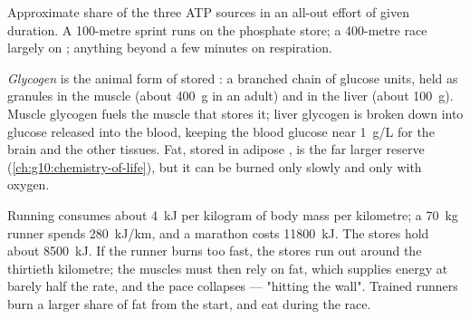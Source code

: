\begin{omfigure}

{\small Approximate share of the three ATP sources in an all-out effort
of given duration. A 100-metre sprint runs on the phosphate store; a
400-metre race largely on ; anything beyond a few minutes
on respiration.}
\end{omfigure}

\begin{definition}[Glycogen]\label{def:g10:exercise-and-energy:glycogen}
\emph{Glycogen} is the animal form of stored
: a branched chain of glucose units, held as granules in
the muscle  (about \qty{400}{g} in an adult) and in the liver
(about \qty{100}{g}). Muscle glycogen fuels the muscle that stores it;
liver glycogen is broken down into glucose released into the blood,
keeping the blood glucose near \qty{1}{g/L} for the brain and the
other tissues. Fat, stored in adipose , is the far larger reserve
(\cref{ch:g10:chemistry-of-life}), but it can be burned only slowly and
only with oxygen.
\end{definition}

\begin{example}\label{ex:g10:exercise-and-energy:wall}
Running consumes about \qty{4}{kJ} per kilogram of body mass per
kilometre; a \qty{70}{kg} runner spends \qty{280}{kJ/km}, and a
marathon costs \qty{11800}{kJ}. The  stores hold about
\qty{8500}{kJ}. If the runner burns  too fast, the stores run
out around the thirtieth kilometre; the muscles must then rely on fat,
which supplies energy at barely half the rate, and the pace collapses
--- "hitting the wall". Trained runners burn a larger share of fat
from the start, and eat  during the race.
\end{example}

